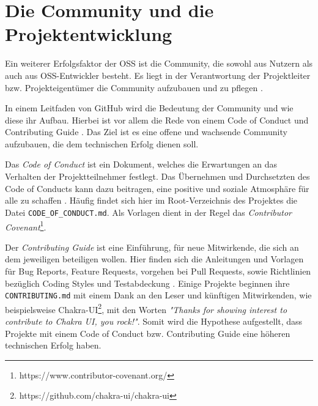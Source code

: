 \section{Die Community und die Projektentwicklung}\label{sec:community}



Ein weiterer Erfolgsfaktor der OSS ist die Community, die sowohl aus Nutzern als auch aus OSS-Entwickler
besteht. Es liegt in der Verantwortung der Projektleiter bzw. Projekteigentümer die Community aufzubauen
und zu pflegen \cite{bangerthWhatMakesComputational2013,GitHubBuildingWelcomingCommunities2022}.


In einem Leitfaden von GitHub wird die Bedeutung der Community und wie diese ihr Aufbau. Hierbei
ist vor allem die Rede von einem Code of Conduct und Contributing Guide
\cite{GitHubBuildingWelcomingCommunities2022}. Das Ziel ist es eine offene und wachsende Community
aufzubauen, die dem technischen Erfolg dienen soll.



Das \textit{Code of Conduct} ist ein Dokument, welches die Erwartungen an das Verhalten der Projektteilnehmer
festlegt. Das Übernehmen und Durchsetzten des Code of Conducts kann dazu beitragen, eine positive
und soziale Atmosphäre für alle zu schaffen \cite{GitHubYourCodeOfConduct2022}. %
Häufig findet sich hier im Root-Verzeichnis des Projektes die Datei \texttt{CODE\_OF\_CONDUCT.md}.
Als Vorlagen dient in der Regel das \textit{Contributor Covenant}\footnote{https://www.contributor-covenant.org/}.


Der \textit{Contributing Guide} ist eine Einführung, für neue Mitwirkende,
die sich an dem jeweiligen beteiligen wollen. Hier finden sich die Anleitungen und Vorlagen für
Bug Reports, Feature Requests, vorgehen bei Pull Requests, sowie Richtlinien bezüglich
Coding Styles und Testabdeckung \cite{GitHubStartingAProject2022}. %
Einige Projekte beginnen ihre \texttt{CONTRIBUTING.md} mit einem Dank an den Leser und künftigen
Mitwirkenden, wie beispielsweise Chakra-UI\footnote{https://github.com/chakra-ui/chakra-ui},
mit den Worten
\textit{"Thanks for showing interest to contribute to Chakra UI, you rock!"}.
Somit wird die Hypothese aufgestellt, dass Projekte mit einem Code of Conduct bzw. Contributing
Guide eine höheren technischen Erfolg haben.

